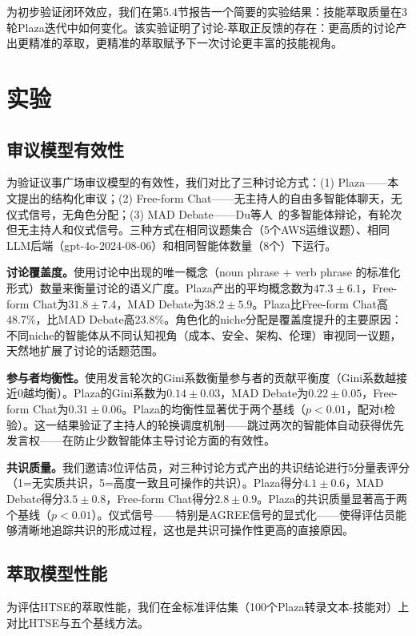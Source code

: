 \documentclass[conference]{IEEEtran}
\begin{document}
为初步验证闭环效应，我们在第5.4节报告一个简要的实验结果：技能萃取质量在3轮Plaza迭代中如何变化。该实验证明了讨论-萃取正反馈的存在：更高质的讨论产出更精准的萃取，更精准的萃取赋予下一次讨论更丰富的技能视角。

\section{实验}

\subsection{审议模型有效性}

为验证议事广场审议模型的有效性，我们对比了三种讨论方式：(1) Plaza——本文提出的结构化审议；(2) Free-form Chat——无主持人的自由多智能体聊天，无仪式信号，无角色分配；(3) MAD Debate——Du等人~\cite{du2023improving}的多智能体辩论，有轮次但无主持人和仪式信号。三种方式在相同议题集合（5个AWS运维议题）、相同LLM后端（gpt-4o-2024-08-06）和相同智能体数量（8个）下运行。

\textbf{讨论覆盖度。}使用讨论中出现的唯一概念（noun phrase + verb phrase 的标准化形式）数量来衡量讨论的语义广度。Plaza产出的平均概念数为$47.3 \pm 6.1$，Free-form Chat为$31.8 \pm 7.4$，MAD Debate为$38.2 \pm 5.9$。Plaza比Free-form Chat高48.7\%，比MAD Debate高23.8\%。角色化的niche分配是覆盖度提升的主要原因：不同niche的智能体从不同认知视角（成本、安全、架构、伦理）审视同一议题，天然地扩展了讨论的话题范围。

\textbf{参与者均衡性。}使用发言轮次的Gini系数衡量参与者的贡献平衡度（Gini系数越接近0越均衡）。Plaza的Gini系数为$0.14 \pm 0.03$，MAD Debate为$0.22 \pm 0.05$，Free-form Chat为$0.31 \pm 0.06$。Plaza的均衡性显著优于两个基线（$p < 0.01$，配对t检验）。这一结果验证了主持人的轮换调度机制——跳过两次的智能体自动获得优先发言权——在防止少数智能体主导讨论方面的有效性。

\textbf{共识质量。}我们邀请3位评估员，对三种讨论方式产出的共识结论进行5分量表评分（1=无实质共识，5=高度一致且可操作的共识）。Plaza得分$4.1 \pm 0.6$，MAD Debate得分$3.5 \pm 0.8$，Free-form Chat得分$2.8 \pm 0.9$。Plaza的共识质量显著高于两个基线（$p < 0.01$）。仪式信号——特别是AGREE信号的显式化——使得评估员能够清晰地追踪共识的形成过程，这也是共识可操作性更高的直接原因。

\subsection{萃取模型性能}

为评估HTSE的萃取性能，我们在金标准评估集（100个Plaza转录文本-技能对）上对比HTSE与五个基线方法。
\end{document}
